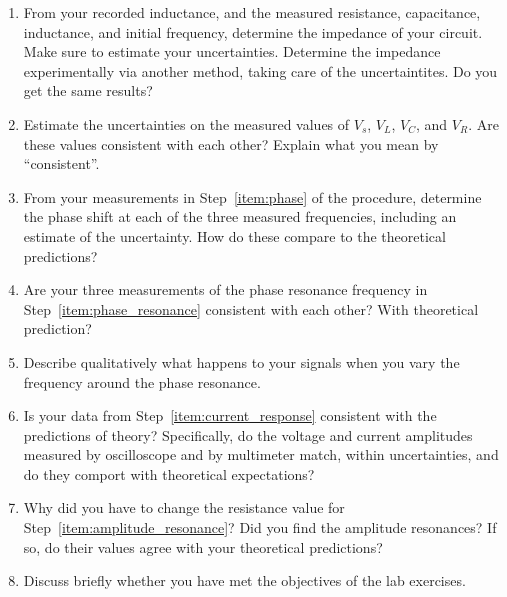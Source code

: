 \documentclass[12pt]{article}
\begin{document}
\begin{enumerate}
\item From your recorded inductance, and the measured resistance,
  capacitance, inductance, and initial frequency, determine the
  impedance of your circuit.  Make sure to estimate your
  uncertainties.  Determine the impedance experimentally via another
  method, taking care of the uncertaintites. %
  Do you get the same results?
\item Estimate the uncertainties on the measured values of $V_s$,
  $V_L$, $V_C$, and $V_R$.  Are these values consistent with each
  other?  Explain what you mean by ``consistent''.
\item From your measurements in Step~\ref{item:phase} of the
  procedure, determine the phase shift at each of the three measured
  frequencies, including an estimate of the uncertainty.  How do these
  compare to the theoretical predictions? 
\item Are your three measurements of the phase resonance frequency in
  Step~\ref{item:phase_resonance} consistent with each other?  With
  theoretical prediction?
\item Describe qualitatively what happens to your signals when you
  vary the frequency around the phase resonance.
\item Is your data from Step~\ref{item:current_response} consistent
  with the predictions of theory?  Specifically, do the voltage and
  current amplitudes measured by oscilloscope and by multimeter match,
  within uncertainties, and do they comport with theoretical
  expectations?
\item Why did you have to change the resistance value for
  Step~\ref{item:amplitude_resonance}?  Did you find the amplitude
  resonances?  If so, do their values agree with your theoretical
  predictions?
\item Discuss briefly whether you have met the objectives of the lab
  exercises.
\end{enumerate}
\end{document}

